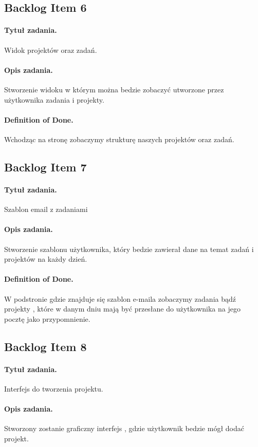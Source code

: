 ﻿\documentclass[a4paper]{article}
\begin{document}
\subsection{Backlog Item 6} 
\paragraph{Tytuł zadania.} Widok projektów oraz zadań.
\paragraph{Opis zadania.} Stworzenie widoku w którym można bedzie zobaczyć utworzone przez użytkownika zadania i projekty.
\paragraph{Definition of Done.} Wchodząc na stronę zobaczymy strukturę naszych projektów oraz zadań.

\subsection{Backlog Item 7} 
\paragraph{Tytuł zadania.} Szablon email z zadaniami
\paragraph{Opis zadania.} Stworzenie szablonu użytkownika, który bedzie zawierał dane na temat zadań i projektów na każdy dzień.
\paragraph{Definition of Done.} W podstronie gdzie znajduje się szablon e-maila zobaczymy zadania bądź projekty , które w danym dniu mają być przesłane do użytkownika na jego pocztę jako przypomnienie.

\subsection{Backlog Item 8} 
\paragraph{Tytuł zadania.} Interfejs do tworzenia projektu.
\paragraph{Opis zadania.} Stworzony zostanie graficzny interfejs , gdzie użytkownik bedzie mógł dodać projekt.
\end{document}
